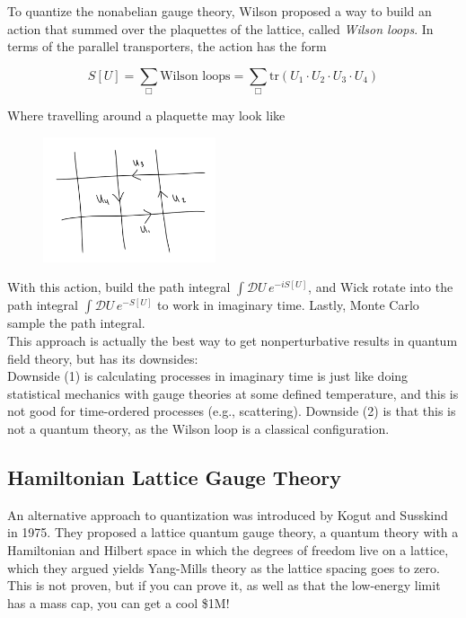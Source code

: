 \noindent To quantize the nonabelian gauge theory, Wilson proposed a way to build an action that summed over the plaquettes of the lattice, called \textit{Wilson loops}. In terms of the parallel transporters, the action has the form

\begin{equation}
S[U] = \sum_\Box \text{Wilson loops} = \sum_\Box \text{tr}(U_1 \cdot U_2 \cdot U_3 \cdot U_4)
\end{equation}

\noindent Where travelling around a plaquette may look like

\begin{figure}[H]
	\centering
	\includegraphics[width=2in]{images/wilson_parallel2.png}
	\caption*{}
\end{figure}

\noindent With this action, build the path integral $\int \mathcal{D}U \, e^{-iS[U]}$, and Wick rotate into the path integral $\int \mathcal{D}U \, e^{-S[U]}$ to work in imaginary time. Lastly, Monte Carlo sample the path integral. \\

\noindent This approach is actually the best way to get nonperturbative results in quantum field theory, but has its downsides: \\

\noindent Downside (1) is calculating processes in imaginary time is just like doing statistical mechanics with gauge theories at some defined temperature, and this is not good for time-ordered processes (e.g., scattering). Downside (2) is that this is not a quantum theory, as the Wilson loop is a classical configuration.

\subsection*{Hamiltonian Lattice Gauge Theory}

\noindent An alternative approach to quantization was introduced by Kogut and Susskind in 1975. They proposed a lattice quantum gauge theory, a quantum theory with a Hamiltonian and Hilbert space in which the degrees of freedom live on a lattice, which they argued yields Yang-Mills theory as the lattice spacing goes to zero. This is not proven, but if you can prove it, as well as that the low-energy limit has a mass cap, you can get a cool \$1M! \\

